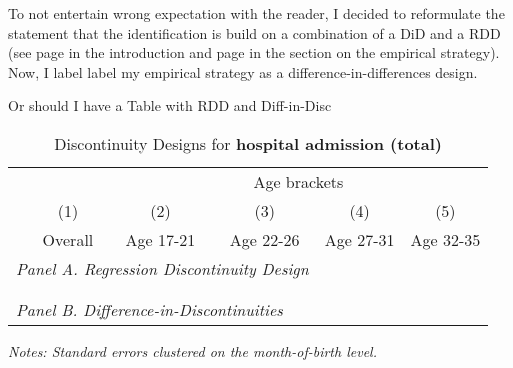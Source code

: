 To not entertain wrong expectation with the reader, I decided to reformulate the statement that the identification is build on a combination of a DiD and a RDD (see page \pageref{rev_mlch: r1_rdd+did_intro} in the introduction and page \pageref{rev_mlch: r1_rdd+did_em_section} in the section on the empirical strategy). Now, I label  label my empirical strategy as a difference-in-differences design. 





Or should I have a Table with RDD and Diff-in-Disc
\begin{table}[H] \centering 
	\begin{threeparttable} \centering \caption{Discontinuity Designs for \textbf{hospital admission (total)}}\label{tab_mlch: revision_RDD_DiffDisc_hopsital2_total}
		{\def\sym#1{\ifmmode^{#1}\else\(^{#1}\)\fi} 
			\begin{tabular}{l*{5}{c}}
				\toprule 
				& & \multicolumn{4}{c}{Age brackets} \\ 
				\cmidrule(lr){3-6}
				&\multicolumn{1}{c}{(1)}&\multicolumn{1}{c}{(2)}&\multicolumn{1}{c}{(3)}&\multicolumn{1}{c}{(4)}&\multicolumn{1}{c}{(5)}\\
				&\multicolumn{1}{c}{Overall}&\multicolumn{1}{c}{Age 17-21}&\multicolumn{1}{c}{Age 22-26}&\multicolumn{1}{c}{Age 27-31} &\multicolumn{1}{c}{Age 32-35}\\
				\midrule
				\multicolumn{4}{l}{\emph{Panel A. Regression Discontinuity Design}} \\
				 \\ \\
				
				\multicolumn{4}{l}{\emph{Panel B. Difference-in-Discontinuities}} \\
				 
				\bottomrule 
		\end{tabular}}
		\begin{tablenotes} 
			\item \scriptsize \emph{Notes: Standard errors clustered on the month-of-birth level.} 
		\end{tablenotes} 
	\end{threeparttable} 
\end{table}







